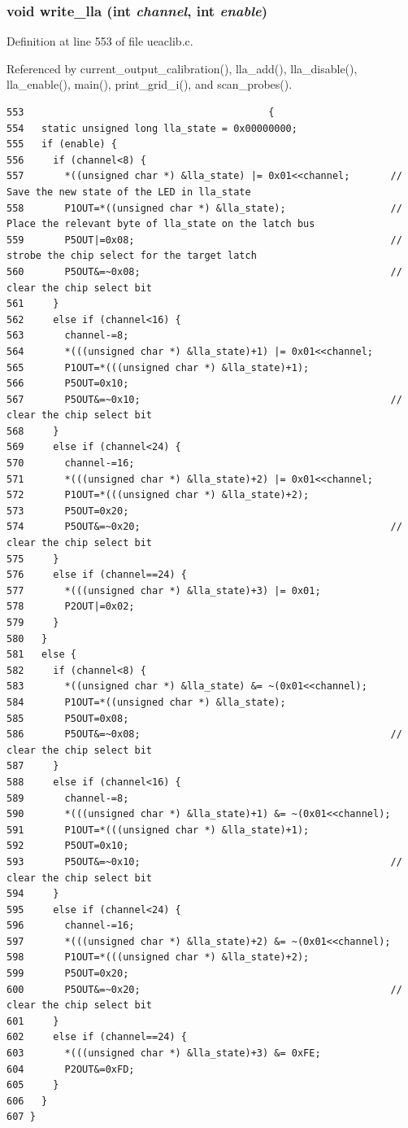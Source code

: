 \subsubsection{\setlength{\rightskip}{0pt plus 5cm}void write\_\-lla (int {\em channel}, int {\em enable})}\label{ueaclib_8c_a25}




Definition at line 553 of file ueaclib.c.

Referenced by current\_\-output\_\-calibration(), lla\_\-add(), lla\_\-disable(), lla\_\-enable(), main(), print\_\-grid\_\-i(), and scan\_\-probes().

\footnotesize\begin{verbatim}553                                          {
554   static unsigned long lla_state = 0x00000000;
555   if (enable) {
556     if (channel<8) {
557       *((unsigned char *) &lla_state) |= 0x01<<channel;       // Save the new state of the LED in lla_state
558       P1OUT=*((unsigned char *) &lla_state);                  // Place the relevant byte of lla_state on the latch bus 
559       P5OUT|=0x08;                                            // strobe the chip select for the target latch
560       P5OUT&=~0x08;                                           // clear the chip select bit
561     }
562     else if (channel<16) {
563       channel-=8;
564       *(((unsigned char *) &lla_state)+1) |= 0x01<<channel;  
565       P1OUT=*(((unsigned char *) &lla_state)+1);  
566       P5OUT=0x10;
567       P5OUT&=~0x10;                                           // clear the chip select bit
568     }
569     else if (channel<24) {
570       channel-=16;
571       *(((unsigned char *) &lla_state)+2) |= 0x01<<channel;  
572       P1OUT=*(((unsigned char *) &lla_state)+2);  
573       P5OUT=0x20;
574       P5OUT&=~0x20;                                           // clear the chip select bit
575     }
576     else if (channel==24) {
577       *(((unsigned char *) &lla_state)+3) |= 0x01;  
578       P2OUT|=0x02;
579     }
580   }
581   else {
582     if (channel<8) {
583       *((unsigned char *) &lla_state) &= ~(0x01<<channel);  
584       P1OUT=*((unsigned char *) &lla_state);  
585       P5OUT=0x08;
586       P5OUT&=~0x08;                                           // clear the chip select bit
587     }
588     else if (channel<16) {
589       channel-=8;
590       *(((unsigned char *) &lla_state)+1) &= ~(0x01<<channel);  
591       P1OUT=*(((unsigned char *) &lla_state)+1);  
592       P5OUT=0x10;
593       P5OUT&=~0x10;                                           // clear the chip select bit
594     }
595     else if (channel<24) {
596       channel-=16;
597       *(((unsigned char *) &lla_state)+2) &= ~(0x01<<channel);  
598       P1OUT=*(((unsigned char *) &lla_state)+2);  
599       P5OUT=0x20;
600       P5OUT&=~0x20;                                           // clear the chip select bit
601     }
602     else if (channel==24) {
603       *(((unsigned char *) &lla_state)+3) &= 0xFE;  
604       P2OUT&=0xFD;
605     }
606   }
607 }
\end{verbatim}\normalsize 




